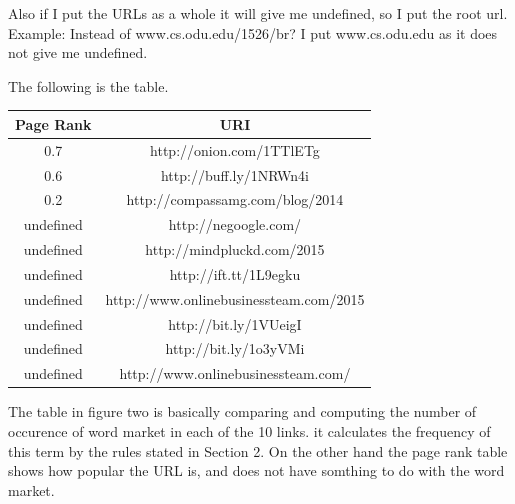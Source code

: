 \documentclass{article}
\begin{document}
Also if I put the URLs as a whole it will give me undefined, so I put the root url.
Example: Instead of www.cs.odu.edu/1526/br? I put www.cs.odu.edu as it does not give me undefined.

The following is the table. 

 \begin{tabular}{||c c||} 
 \hline
Page Rank & URI  \\ [0.5ex] 
 \hline\hline
 0.7 & http://onion.com/1TTlETg  \\
\hline
 0.6& http://buff.ly/1NRWn4i 
 \\
 \hline
 0.2 & http://compassamg.com/blog/2014
 \\
 \hline
 undefined & http://negoogle.com/
 \\
 \hline
 undefined & http://mindpluckd.com/2015
\\
\hline
undefined &  http://ift.tt/1L9egku 
 \\
 \hline
 undefined & http://www.onlinebusinessteam.com/2015
 \\
 \hline
undefined & http://bit.ly/1VUeigI
 \\
 \hline
 undefined & http://bit.ly/1o3yVMi\\ 
 \hline
undefined & http://www.onlinebusinessteam.com/
 \\
 \hline

\end{tabular}
The table in figure two is basically comparing and computing the number of occurence of word market in each of the 10 links. it calculates  the frequency of this term by the rules stated in Section 2.
On the other hand the page rank table shows how popular the URL is, and does not have somthing to do with the word market.
\end{document}
